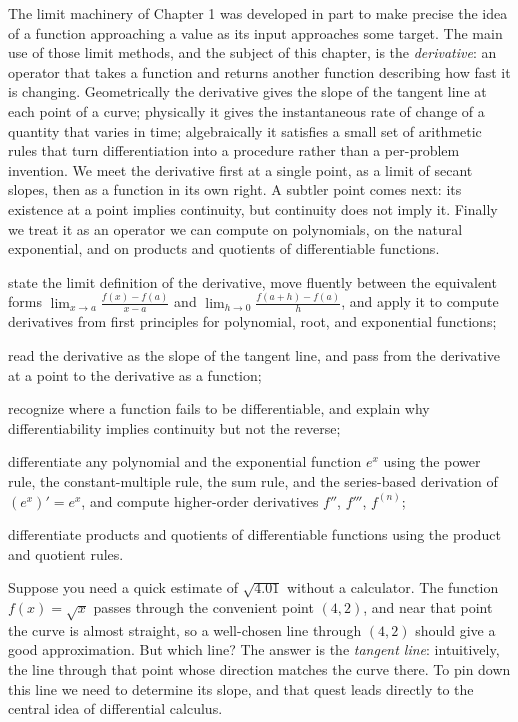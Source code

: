 \documentclass[a4paper,12pt,oneside]{memoir}
\begin{document}
\begin{lead}
The limit machinery of Chapter 1 was developed in part to make precise the idea of a function approaching a value as its input approaches some target. The main use of those limit methods, and the subject of this chapter, is the \emph{derivative}: an operator that takes a function and returns another function describing how fast it is changing. Geometrically the derivative gives the slope of the tangent line at each point of a curve; physically it gives the instantaneous rate of change of a quantity that varies in time; algebraically it satisfies a small set of arithmetic rules that turn differentiation into a procedure rather than a per-problem invention. We meet the derivative first at a single point, as a limit of secant slopes, then as a function in its own right. A subtler point comes next: its existence at a point implies continuity, but continuity does not imply it. Finally we treat it as an operator we can compute on polynomials, on the natural exponential, and on products and quotients of differentiable functions.
\end{lead}
\begin{objectives}
  \item state the limit definition of the derivative, move fluently between the equivalent forms \(\lim_{x \to a} \tfrac{f(x) - f(a)}{x - a}\) and \(\lim_{h \to 0} \tfrac{f(a + h) - f(a)}{h}\), and apply it to compute derivatives from first principles for polynomial, root, and exponential functions;
  \item read the derivative as the slope of the tangent line, and pass from the derivative at a point to the derivative as a function;
  \item recognize where a function fails to be differentiable, and explain why differentiability implies continuity but not the reverse;
  \item differentiate any polynomial and the exponential function \(e^{x}\) using the power rule, the constant-multiple rule, the sum rule, and the series-based derivation of \((e^{x})' = e^{x}\), and compute higher-order derivatives \(f''\), \(f'''\), \(f^{(n)}\);
  \item differentiate products and quotients of differentiable functions using the product and quotient rules.
\end{objectives}
Suppose you need a quick estimate of \(\sqrt{4.01}\) without a calculator. The function \(f(x) = \sqrt{x}\) passes through the convenient point \((4, 2)\), and near that point the curve is almost straight, so a well-chosen line through \((4, 2)\) should give a good approximation. But which line? The answer is the \emph{tangent line}: intuitively, the line through that point whose direction matches the curve there. To pin down this line we need to determine its slope, and that quest leads directly to the central idea of differential calculus.
\end{document}
